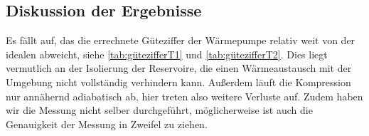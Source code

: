 \documentclass{scrartcl} %
\begin{document}
    \subsection{Diskussion der Ergebnisse}
    \label{sec:Auswertung}
    Es fällt auf, das die errechnete Güteziffer der Wärmepumpe relativ weit von der idealen abweicht, siehe \ref{tab:gütezifferT1} und \ref{tab:gütezifferT2}. Dies liegt vermutlich an der Isolierung der
    Reservoire, die einen Wärmeaustausch mit der Umgebung nicht vollständig verhindern kann. Außerdem läuft die Kompression nur annähernd adiabatisch ab, hier treten also weitere
    Verluste auf. Zudem haben wir die Messung nicht selber durchgeführt, möglicherweise ist auch die Genauigkeit der Messung in Zweifel zu ziehen.
\end{document}
